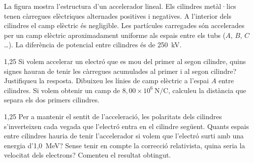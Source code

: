 La figura mostra l'estructura d'un accelerador lineal. Els cilindres metàl·lics tenen càrregues elèctriques alternades positives i negatives. A l'interior dels cilindres el camp elèctric és negligible. Les partícules carregades són accelerades per un camp elèctric aproximadament uniforme als espais entre els tubs ($A$, $B$, $C$\ldots). La diferència de potencial entre cilindres és de 250~kV.


\begin{apartat}{1,25}
Si volem accelerar un electró que es mou del primer al segon cilindre, quins signes hauran de tenir les càrregues acumulades al primer i al segon cilindre? Justifiqueu la resposta. Dibuixeu les línies de camp elèctric a l'espai $A$ entre cilindres. Si volem obtenir un camp de $8,00\times 10^{6}\ \mathrm{N/C}$, calculeu la distància que separa els dos primers cilindres.
\end{apartat}

\begin{apartat}{1,25}
Per a mantenir el sentit de l'acceleració, les polaritats dels cilindres s'inverteixen cada vegada que l'electró entra en el cilindre següent. Quants espais entre cilindres hauria de tenir l'accelerador si volem que l'electró surti amb una energia d'1,0~MeV? Sense tenir en compte la correcció relativista, quina seria la velocitat dels electrons? Comenteu el resultat obtingut.
\end{apartat}

